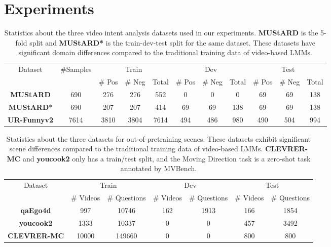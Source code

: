 
\section{Experiments}

\begin{table}[t]
\centering
\caption{Statistics about the three video intent analysis datasets used in our experiments. \textbf{MUStARD} is the 5-fold split and \textbf{MUStARD*} is the train-dev-test split for the same dataset. These datasets have significant domain differences compared to the traditional training data of video-based LMMs.}
\resizebox{0.95\textwidth}{!}
{
\begin{tabular}{c | c | c c c | c c c | c c c}
\toprule
Dataset & \#Samples & \multicolumn{3}{c|}{Train} & \multicolumn{3}{c|}{Dev} & \multicolumn{3}{c}{Test}\\
& & \# Pos & \# Neg & Total & \# Pos & \# Neg & Total & \# Pos & \# Neg & Total \\
\midrule

\textbf{MUStARD} & 690 & 276 & 276 & 552 & 0 & 0 & 0 & 69 & 69 & 138 \\ 
\textbf{MUStARD$*$} & 690 & 207 & 207 & 414 & 69 & 69 & 138 & 69 & 69 & 138  \\
\textbf{UR-Funnyv2} & 7614 & 3810 & 3804 & 7614 & 494 & 486 & 980 & 490 & 504 & 994 \\ 
\bottomrule
\end{tabular}
}
\label{tab:dataset}
\end{table}

\begin{table}[t]
\centering
\caption{Statistics about the three datasets for out-of-pretraining scenes. These datasets exhibit significant scene differences compared to the traditional training data of video-based LMMs. \textbf{CLEVRER-MC} and \textbf{youcook2} only has a train/test split, and the Moving Direction task is a zero-shot task annotated by MVBench.}
\resizebox{0.95\textwidth}{!}
{
\begin{tabular}{c | c c | c c | c c}
\toprule
Dataset & \multicolumn{2}{c|}{Train} & \multicolumn{2}{c|}{Dev} & \multicolumn{2}{c}{Test}\\
& \# Videos & \# Questions  & \# Videos & \# Questions & \# Videos & \# Questions   \\
\midrule

\textbf{qaEgo4d}   & 997 &10746 & 162 & 1913 & 166 & 1854 \\ 
\textbf{youcook2} &1333  & 10337 & 0 & 0 & 457& 3492  \\
\textbf{CLEVRER-MC}  & 10000 & 149660 & 0 & 0 & 800 & 800 \\ 
\bottomrule
\end{tabular}
}
\label{tab:dataset2}
\end{table}


